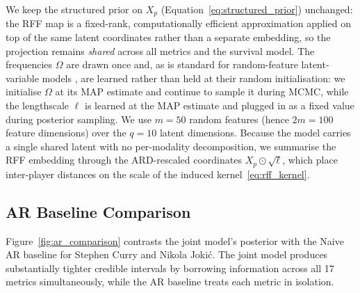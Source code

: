 We keep the structured prior on $X_p$ (Equation~\ref{eq:structured_prior}) unchanged: the RFF map is a fixed-rank, computationally efficient approximation applied on top of the same latent coordinates rather than a separate embedding, so the projection remains \emph{shared} across all metrics and the survival model.  The frequencies $\Omega$ are drawn once and, as is standard for random-feature latent-variable models \cite{gundersen2021latent, zhang2023bayesiannonlinearlatentvariable}, are learned rather than held at their random initialisation: we initialise $\Omega$ at its MAP estimate and continue to sample it during MCMC, while the lengthscale $\ell$ is learned at the MAP estimate and plugged in as a fixed value during posterior sampling.  We use $m = 50$ random features (hence $2m = 100$ feature dimensions) over the $q = 10$ latent dimensions.  Because the model carries a single shared latent with no per-modality decomposition, we summarise the RFF embedding through the ARD-rescaled coordinates $X_p \odot \sqrt{\ell}$, which place inter-player distances on the scale of the induced kernel~\ref{eq:rff_kernel}.

\subsection{AR Baseline Comparison}
\label{sec:ar_comparison}

Figure~\ref{fig:ar_comparison} contrasts the joint model's posterior with the Naive AR baseline for Stephen Curry and Nikola Joki\'{c}. The joint model produces substantially tighter credible intervals by borrowing information across all 17 metrics simultaneously, while the AR baseline treats each metric in isolation.

